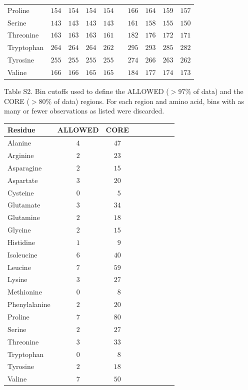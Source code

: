 \documentclass[12pt]{article}
\begin{document}
\begin{center}
\begin{tabular}{lccccccccc}
Proline          & $154$ & $154$ & $154$ & $154$ & & $166$ & $164$ & $159$ & $157$\\
Serine           & $143$ & $143$ & $143$ & $143$ & & $161$ & $158$ & $155$ & $150$\\
Threonine        & $163$ & $163$ & $163$ & $161$ & & $182$ & $176$ & $172$ & $171$\\
Tryptophan       & $264$ & $264$ & $264$ & $262$ & & $295$ & $293$ & $285$ & $282$\\
Tyrosine         & $255$ & $255$ & $255$ & $255$ & & $274$ & $266$ & $263$ & $262$\\
Valine           & $166$ & $166$ & $165$ & $165$ & & $184$ & $177$ & $174$ & $173$\\
\hline
\end{tabular}
\end{center}

\bigskip

\noindent Table S2. Bin cutoffs used to define the ALLOWED ($>97\%$ of data) and the CORE ($>80\%$ of data) regions. For each region and amino acid, bins with as many or fewer observations as listed were discarded.

\begin{center}
\footnotesize
\begin{tabular}{lcccccccc}
Residue & ALLOWED & CORE \\
\hline Alanine   & $4$ & $47$ \\
Arginine         & $2$ & $23$ \\
Asparagine       & $2$ & $15$ \\
Aspartate        & $3$ & $20$ \\
Cysteine         & $0$ & $\phantom{0}5$ \\
Glutamate        & $3$ & $34$ \\
Glutamine        & $2$ & $18$ \\
Glycine          & $2$ & $15$ \\
Histidine        & $1$ & $\phantom{0}9$ \\
Isoleucine       & $6$ & $40$ \\
Leucine          & $7$ & $59$ \\
Lysine           & $3$ & $27$ \\
Methionine       & $0$ & $\phantom{0}8$ \\
Phenylalanine    & $2$ & $20$ \\
Proline          & $7$ & $80$ \\
Serine           & $2$ & $27$ \\
Threonine        & $3$ & $33$ \\
Tryptophan       & $0$ & $\phantom{0}8$ \\
Tyrosine         & $2$ & $18$ \\
Valine           & $7$ & $50$ \\
\hline
\end{tabular}
\end{center}
\end{document}
